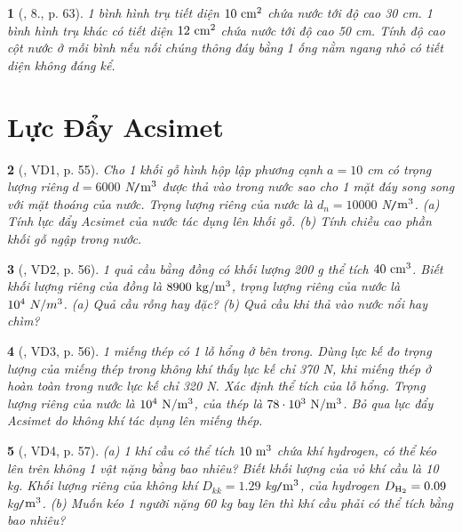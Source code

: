 \documentclass{article}
\newtheorem{baitoan}{}
\begin{document}
\begin{baitoan}[\cite{Van_Quyen_Hanh_Nhu_10_chuyen_Ly}, 8., p. 63]
	1 bình hình trụ tiết diện $\rm10\ cm^2$ chứa nước tới độ cao {\rm30 cm}. 1 bình hình trụ khác có tiết diện $\rm12\ cm^2$ chứa nước tới độ cao {\rm50 cm}. Tính độ cao cột nước ở mỗi bình nếu nối chúng thông đáy bằng 1 ống nằm ngang nhỏ có tiết diện không đáng kể.
\end{baitoan}


\section{Lực Đẩy Acsimet}


\begin{baitoan}[\cite{Van_Quyen_Hanh_Nhu_10_chuyen_Ly}, VD1, p. 55]
	Cho 1 khối gỗ hình hộp lập phương cạnh $a = 10$ {\rm cm} có trọng lượng riêng $d = 6000$ {\rm N{\tt/}$\rm m^3$} được thả vào trong nước sao cho 1 mặt đáy song song với mặt thoáng của nước. Trọng lượng riêng của nước là $d_n = 10000$ {\rm N{\tt/}$\rm m^3$}. (a) Tính lực đẩy Acsimet của nước tác dụng lên khối gỗ. (b) Tính chiều cao phần khối gỗ ngập trong nước.
\end{baitoan}

\begin{baitoan}[\cite{Van_Quyen_Hanh_Nhu_10_chuyen_Ly}, VD2, p. 56]
	1 quả cầu bằng đồng có khối lượng {\rm200 g} thể tích $\rm40\ cm^3$. Biết khối lượng riêng của đồng là $\rm8900\ kg{\tt/}m^3$, trọng lượng riêng của nước là $10^4\ N{\tt/}m^3$. (a) Quả cầu rỗng hay đặc? (b) Quả cầu khi thả vào nước nổi hay chìm?
\end{baitoan}

\begin{baitoan}[\cite{Van_Quyen_Hanh_Nhu_10_chuyen_Ly}, VD3, p. 56]
	1 miếng thép có 1 lỗ hổng ở bên trong. Dùng lực kế đo trọng lượng của miếng thép trong không khí thấy lực kế chỉ {\rm370 N}, khi miếng thép ở hoàn toàn trong nước lực kế chỉ {\rm320 N}. Xác định thể tích của lỗ hổng. Trọng lượng riêng của nước là $\rm10^4\ N{\tt/}m^3$, của thép là $\rm78\cdot 10^3\ N{\tt/}m^3$. Bỏ qua lực đẩy Acsimet do không khí tác dụng lên miếng thép.
\end{baitoan}

\begin{baitoan}[\cite{Van_Quyen_Hanh_Nhu_10_chuyen_Ly}, VD4, p. 57]
	(a) 1 khí cầu có thể tích $\rm10\ m^3$ chứa khí hydrogen, có thể kéo lên trên không 1 vật nặng bằng bao nhiêu? Biết khối lượng của vỏ khí cầu là {\rm10 kg}. Khối lượng riêng của không khí $D_{kk} = 1.29$ {\rm kg{\tt/}$\rm m^3$}, của hydrogen $D_{\rm H_2} = 0.09$ {\rm kg{\tt/}$\rm m^3$}. (b) Muốn kéo 1 người nặng {\rm60 kg} bay lên thì khí cầu phải có thể tích bằng bao nhiêu?
\end{baitoan}
\end{document}
